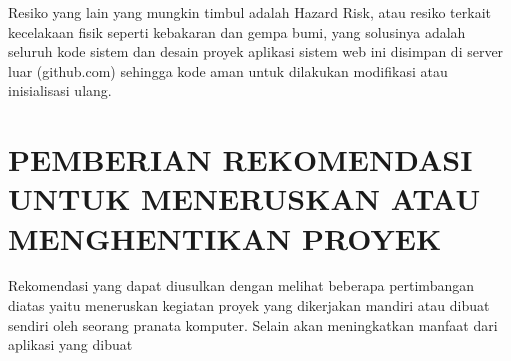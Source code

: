 \documentclass[pdftex,12pt, oneside]{article}
\begin{document}
Resiko yang lain yang mungkin timbul adalah Hazard Risk, atau resiko terkait kecelakaan fisik seperti kebakaran dan gempa bumi, yang solusinya adalah seluruh kode sistem dan desain proyek aplikasi sistem web ini disimpan di server luar (github.com) sehingga kode aman untuk dilakukan modifikasi atau inisialisasi ulang.

\section{PEMBERIAN REKOMENDASI UNTUK MENERUSKAN ATAU MENGHENTIKAN PROYEK}

Rekomendasi yang dapat diusulkan dengan melihat beberapa pertimbangan diatas yaitu meneruskan kegiatan proyek yang dikerjakan mandiri atau dibuat sendiri oleh seorang pranata komputer. Selain akan meningkatkan manfaat dari aplikasi yang dibuat 
\end{document}
